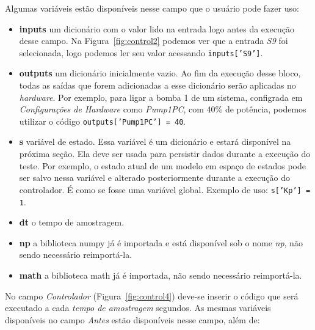 Algumas variáveis estão disponíveis nesse campo que o usuário pode fazer uso:

\begin{itemize}
    \item \textbf{inputs} um dicionário com o valor lido na entrada logo antes
                          da execução desse campo. Na Figura~\ref{fig:control2}
                          podemos ver que a entrada \textit{S9} foi selecionada,
                          logo podemos ler seu valor acessando
                          \texttt{inputs['S9']}.
    \item \textbf{outputs} um dicionário inicialmente vazio. Ao fim da execução
                           desse bloco, todas as saídas que forem adicionadas a
                           esse dicionário serão aplicadas no \textit{hardware}.
                           Por exemplo, para ligar a bomba 1 de um sistema,
                           configrada em \textit{Configurações de Hardware} como
                           \textit{Pump1PC}, com 40\% de potência, podemos
                           utilizar o código
                           \texttt{outputs['Pump1PC'] = 40}.
    \item \textbf{s} variável de estado. Essa variável é um dicionário e estará
                     disponível na próxima seção. Ela deve ser usada para
                     persistir dados durante a execução do teste. Por exemplo, o
                     estado atual de um modelo em espaço de estados pode ser
                     salvo nessa variável e alterado posteriormente durante a
                     execução do controlador. É como se fosse uma variável
                     global. Exemplo de uso: \texttt{s['Kp'] = 1}.
    \item \textbf{dt} o tempo de amostragem.
    \item \textbf{np} a biblioteca numpy já é importada e está disponível sob o
                      nome \textit{np}, não sendo necessário reimportá-la.
    \item \textbf{math} a biblioteca math já é importada, não sendo necessário
                        reimportá-la.
\end{itemize}

No campo \textit{Controlador} (Figura~\ref{fig:control4}) deve-se inserir o
código que será executado a cada \textit{tempo de amostragem} segundos. As
mesmas variáveis disponíveis no campo \textit{Antes} estão disponíveis nesse
campo, além de:

